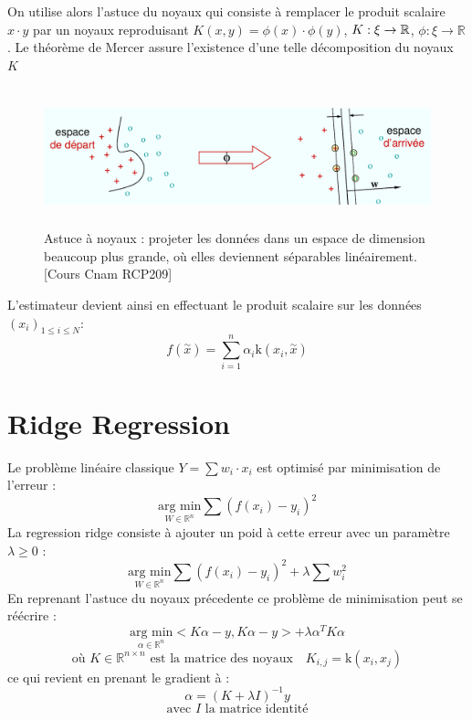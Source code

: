 \documentclass[a4paper,12pt,titlepage]{report}
\begin{document}
On utilise alors l'astuce du noyaux qui consiste à remplacer le produit scalaire $x \cdot y$
par un noyaux reproduisant $K(x,y) = \phi(x) \cdot \phi(y)$, $K :\xi \time \xi \rightarrow \mathbb{R}$, $\phi :\xi \rightarrow \mathbb{R}$  . Le théorème de Mercer assure l'existence d'une telle décomposition du noyaux $K$

\begin{figure}[!h]
		
		\includegraphics[height = 4cm, keepaspectratio]{graphes/mnoyaux05.png}
		\caption{Astuce à noyaux : projeter les données dans un espace de dimension beaucoup plus grande, où elles deviennent séparables linéairement.[Cours Cnam RCP209]}
\end{figure}

L'estimateur devient ainsi en effectuant le produit scalaire sur les données $(x_{i})_{1 \leqslant i \leqslant N}$:
\[
f(\overset{\sim}{x}) = \sum_{i = 1}^{n}{\alpha_i \text{k}(x_i , \overset{\sim}{x})}
\]


\section{Ridge Regression}

Le problème linéaire classique $Y = \sum{w_i \cdot x_i}$ est optimisé par minimisation de l'erreur :
\[
\underset{W \in \mathbb{R}^{n}}{\text{arg min}}\sum{(f(x_i) - y_i)^{2}}
\]
La regression ridge consiste à ajouter un poid à cette erreur avec un paramètre $\lambda\geqslant 0 $ :
\[
\underset{W \in \mathbb{R}^{n}}{\text{arg min}}\sum{(f(x_i) - y_i)^{2}} +  \lambda \sum{w_{i}^{2}}
\]
En reprenant l'astuce du noyaux précedente ce problème de minimisation peut se réécrire :
\[
	\underset{\alpha \in \mathbb{R}^{n}}{\text{arg min}}<K \alpha - y , K 	\alpha -y > + \lambda \alpha^{T} K \alpha 
\]
\[
	\text{où } K \in \mathbb{R}^{n \times n} \text{ est la matrice des 			noyaux} \quad K_{i,j} = \text{k}(x_i, x_j)
\]
ce qui revient en prenant le gradient à :
\[
\alpha	=(K + \lambda I)^{-1}y 
\]
\[
\text{avec $I$ la matrice identité}
\]
\end{document}
